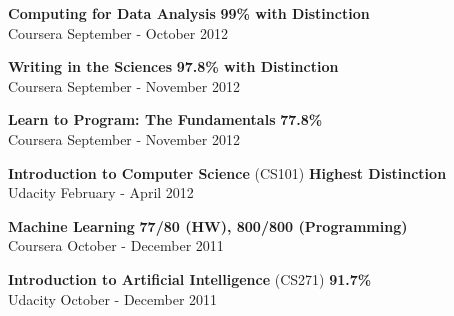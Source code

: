 \documentclass[margin,line]{resume}
\begin{document}
\begin{resume}
    \begin{list2}
	\item \textbf{Computing for Data Analysis} \hspace{70mm} \textbf{99\% with Distinction} \\ Coursera \hspace{105mm} September - October 2012
	\end{list2}

    \begin{list2}
	\item \textbf{Writing in the Sciences} \hspace{78mm} \textbf{97.8\% with Distinction} \\ Coursera \hspace{102mm} September - November 2012
	\end{list2}
    
    \begin{list2}
	\item \textbf{Learn to Program: The Fundamentals} \hspace{80mm} \textbf{77.8\%} \\ Coursera \hspace{102mm} September - November 2012
	\end{list2}
    
    \begin{list2}
	\item \textbf{Introduction to Computer Science} (CS101) \hspace{50mm} \textbf{Highest Distinction} \\ Udacity \hspace{112mm} February - April 2012
	\end{list2}

    \begin{list2}
	\item \textbf{Machine Learning} \hspace{59mm} \textbf{77/80 (HW), 800/800 (Programming)} \\ Coursera \hspace{105mm} October - December 2011
	\end{list2}
    
    \begin{list2}
	\item \textbf{Introduction to Artificial Intelligence} (CS271) \hspace{70mm} \textbf{91.7\%} \\ Udacity \hspace{108mm} October - December 2011
	\end{list2}
    

\end{resume}
\end{document}
